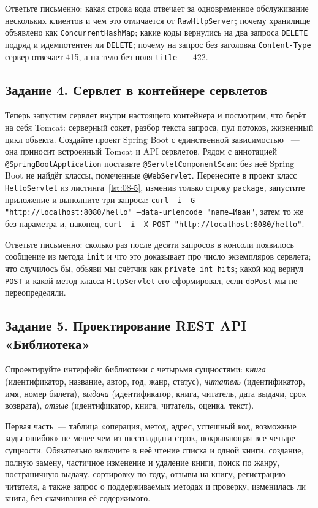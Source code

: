 Ответьте письменно: какая строка кода отвечает за одновременное обслуживание
нескольких клиентов и чем это отличается от \texttt{RawHttpServer}; почему
хранилище объявлено как \texttt{ConcurrentHashMap}; какие коды вернулись на два
запроса \texttt{DELETE} подряд и идемпотентен ли \texttt{DELETE}; почему на
запрос без заголовка \texttt{Content-Type} сервер отвечает 415, а на тело без
поля \texttt{title}~--- 422.

\subsection*{Задание 4. Сервлет в контейнере сервлетов}

Теперь запустим сервлет внутри настоящего контейнера и посмотрим, что берёт на
себя Tomcat: серверный сокет, разбор текста запроса, пул потоков, жизненный
цикл объекта. Создайте проект Spring Boot с единственной зависимостью
~--- она приносит встроенный Tomcat и API сервлетов. Рядом с
аннотацией \texttt{@SpringBootApplication} поставьте
\texttt{@ServletComponentScan}: без неё Spring Boot не найдёт классы,
помеченные \texttt{@WebServlet}. Перенесите в проект класс
\texttt{HelloServlet} из листинга~\ref{lst:08-5}, изменив только строку
\texttt{package}, запустите приложение и выполните три запроса:
\texttt{curl -i -G "http://localhost:8080/hello" --data-urlencode "name=Иван"},
затем то же без параметра и, наконец,
\texttt{curl -i -X POST "http://localhost:8080/hello"}.

Ответьте письменно: сколько раз после десяти запросов в консоли появилось
сообщение из метода \texttt{init} и что это доказывает про число экземпляров
сервлета; что случилось бы, объяви мы счётчик как \texttt{private int hits};
какой код вернул \texttt{POST} и какой метод класса \texttt{HttpServlet} его
сформировал, если \texttt{doPost} мы не переопределяли.

\subsection*{Задание 5. Проектирование REST API «Библиотека»}

Спроектируйте интерфейс библиотеки с четырьмя сущностями: \emph{книга}
(идентификатор, название, автор, год, жанр, статус), \emph{читатель}
(идентификатор, имя, номер билета), \emph{выдача} (идентификатор, книга,
читатель, дата выдачи, срок возврата), \emph{отзыв} (идентификатор, книга,
читатель, оценка, текст).

Первая часть~--- таблица «операция, метод, адрес, успешный код, возможные коды
ошибок» не менее чем из шестнадцати строк, покрывающая все четыре сущности.
Обязательно включите в неё чтение списка и одной книги, создание, полную замену,
частичное изменение и удаление книги, поиск по жанру, постраничную выдачу,
сортировку по году, отзывы на книгу, регистрацию читателя, а также запрос о
поддерживаемых методах и проверку, изменилась ли книга, без скачивания её
содержимого.

